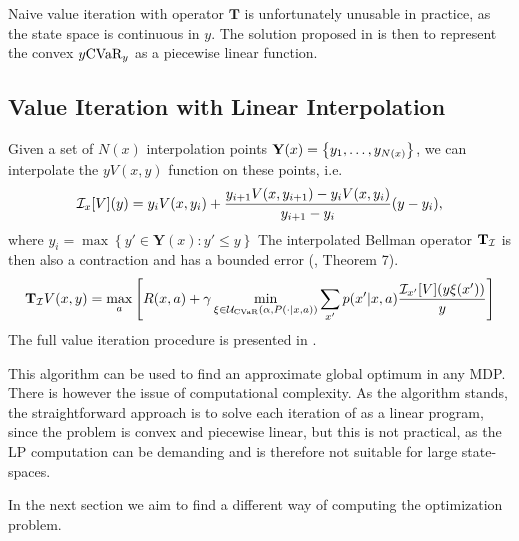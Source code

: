 Naive value iteration with operator $\mathbf{T}$ is unfortunately unusable in practice, as the state space is continuous in $y$. The solution proposed in \cite{chow2015risk} is then to represent the convex $y\text{CVaR}_y$ as a piecewise linear function. 

\subsection{Value Iteration with Linear Interpolation}

Given a set of $N(x)$ interpolation points $\mathbf{Y}(x) = \left\{ {y_1, \dots, y_{N(x)}} \right\}$, we can interpolate the $yV(x,y)$ function on these points, i.e.
%
\begin{equation*}
\mathcal{I}_{x}[V](y)=y_iV(x,y_{i})+\frac{y_{i+1}V(x,y_{i+1})-y_iV(x,y_{i})}{y_{i+1}-y_i}(y-y_i),
\end{equation*}
%
where $y_i = \max \left\{y'\in \mathbf{Y}(x) : y' \leq y\right\}$
The interpolated Bellman operator $\mathbf{T}_{\mathcal{I}}$ is then also a contraction and has a bounded error (\citep{chow2015risk}, Theorem 7). 
%
\begin{equation}\label{eqn:linearbellman}
\mathbf{T}_{\mathcal{I}} V(x, y) = \max_a \left[ { R(x, a) + \gamma \min_{\xi \in \mathcal{U}_{\text{CVaR}}(\alpha, P(\cdot | x, a))} \sum_{x'} p(x'| x, a)\dfrac{\mathcal{I}_{x'} [V](y\xi(x'))}{y}} \right]
\end{equation}
%
The full value iteration procedure is presented in . 

This algorithm can be used to find an approximate global optimum in any MDP. There is however the issue of computational complexity. As the algorithm stands, the straightforward approach is to solve each iteration of  as a linear program, since the problem is convex and piecewise linear, but this is not practical, as the LP computation can be demanding and is therefore not suitable for large state-spaces.


In the next section we aim to find a different way of computing the optimization problem.

